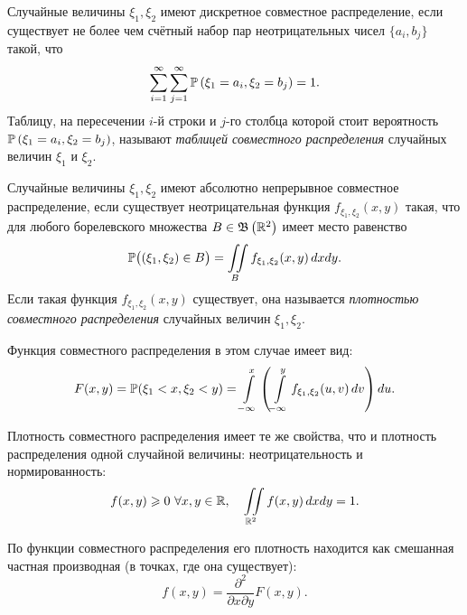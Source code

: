 \begin{defn}
    Случайные величины $\xi_1, \xi_2$ имеют дискретное совместное распределение, если существует не более чем счётный набор пар неотрицательных чисел $\{a_{i}, b_{j}\}$ такой, что
    \begin{equation*}
        \sum\limits_{i=1}^{\infty} \sum\limits_{j=1}^{\infty} \operatorname{\mathbb{P}}\left(\xi_{1}=a_{i}, \xi_{2}=b_{j}\right)=1.
    \end{equation*}
    Таблицу, на пересечении $i$-й строки и $j$-го столбца которой стоит вероятность $\operatorname{\mathbb{P}}\left(\xi_{1}=a_{i}, \xi_{2}=b_{j}\right)$, называют \textit{таблицей совместного распределения} случайных величин $\xi_1$ и $\xi_2$.
\end{defn}
\begin{defn}
    Случайные величины $\xi_1, \xi_2$ имеют абсолютно непрерывное совместное распределение, если существует неотрицательная функция $f_{\xi_{1}, \xi_{2}}(x, y)$ такая, что для любого борелевского множества $B \in \mathfrak{B}\left(\mathbb{R}^{2}\right)$ имеет место равенство
    \begin{equation*}
        \operatorname{\mathbb{P}}\bigl(\left(\xi_{1}, \xi_{2}\right) \in B\bigr)=\iint\limits_{B} f_{\xi_{1}, \xi_{2}}(x, y) \, dx dy.
    \end{equation*}
    Если такая функция $f_{\xi_{1}, \xi_{2}}(x, y)$ существует, она называется \textit{плотностью совместного распределения} случайных величин $\xi_1, \xi_2$.
    
    Функция совместного распределения в этом случае имеет вид:
    \begin{equation*}
        F(x, y)=\operatorname{\mathbb{P}}(\xi_{1}<x, \xi_{2}<y)=\int\limits_{-\infty}^{x}\left(\int\limits_{-\infty}^{y} f_{\xi_{1}, \xi_{2}}(u, v) \, dv\right) du.
    \end{equation*}
\end{defn}

\begin{rmrk}
    Плотность совместного распределения имеет те же свойства, что и плотность распределения одной случайной величины: неотрицательность и нормированность:
    \begin{equation*}
        f(x, y) \geqslant 0~ \forall x, y \in \mathbb{R}, \quad \iint\limits_{\mathbb{R}^{2}} f(x, y) \, dx dy = 1.
    \end{equation*}

    По функции совместного распределения его плотность находится как смешанная частная производная (в точках, где она существует):
    \begin{equation*}
        f(x, y)=\frac{\partial^{2}}{\partial x \partial y} F(x, y).
    \end{equation*}
\end{rmrk}

